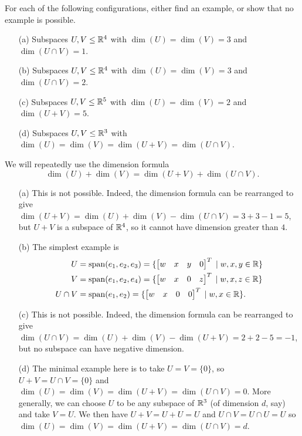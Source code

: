 \documentclass[a4paper]{amsart}
\renewenvironment{solution}{\SolutionInline}{\endSolutionInline}
\begin{document}
\begin{exercise}\label{ex-dim-formula-i}
 For each of the following configurations, either find an example, or
 show that no example is possible.
 \begin{itemize}
  \item[(a)] Subspaces $U,V\leq{\mathbb{R}}^4$ with $\dim(U)=\dim(V)=3$ and
   $\dim(U\cap V)=1$.
  \item[(b)] Subspaces $U,V\leq{\mathbb{R}}^4$ with $\dim(U)=\dim(V)=3$ and
   $\dim(U\cap V)=2$.
  \item[(c)] Subspaces $U,V\leq{\mathbb{R}}^5$ with $\dim(U)=\dim(V)=2$ and
   $\dim(U+V)=5$.
  \item[(d)] Subspaces $U,V\leq{\mathbb{R}}^3$ with
   $\dim(U)=\dim(V)=\dim(U+V)=\dim(U\cap V)$.
 \end{itemize}
\end{exercise}
\begin{solution}
 We will repeatedly use the dimension formula 
 \[ \dim(U)+\dim(V) = \dim(U+V) + \dim(U\cap V). \]
 \begin{itemize}
  \item[(a)] This is not possible.  Indeed, the dimension formula can
   be rearranged to give
   $\dim(U+V)=\dim(U)+\dim(V)-\dim(U\cap V)=3+3-1=5$, but $U+V$ is a
   subspace of ${\mathbb{R}}^4$, so it cannot have dimension greater than $4$.
  \item[(b)] The simplest example is  
    \begin{align*}
     U &= \operatorname{span}(e_1,e_2,e_3)
        = \{\left[\begin{matrix} w & x & y & 0 \end{matrix}\right]^T\;|\; w,x,y\in{\mathbb{R}}\} \\
     V &= \operatorname{span}(e_1,e_2,e_4)
        = \{\left[\begin{matrix} w & x & 0 & z \end{matrix}\right]^T\;|\; w,x,z\in{\mathbb{R}}\} \\
     U\cap V &= \operatorname{span}(e_1,e_2)
        = \{\left[\begin{matrix} w & x & 0 & 0 \end{matrix}\right]^T\;|\; w,x\in{\mathbb{R}}\}.
    \end{align*}
   \item[(c)] This is not possible.  Indeed, the dimension formula can
    be rearranged to give
    $\dim(U\cap V)=\dim(U)+\dim(V)-\dim(U+V)=2+2-5=-1$, but no subspace
    can have negative dimension.
   \item[(d)] The minimal example here is to take $U=V=\{0\}$, so
    $U+V=U\cap V=\{0\}$ and $\dim(U)=\dim(V)=\dim(U+V)=\dim(U\cap V)=0$.
    More generally, we can choose $U$ to be any subspace of ${\mathbb{R}}^3$ (of
    dimension $d$, say) and take $V=U$.  We then have $U+V=U+U=U$ and
    $U\cap V=U\cap U=U$ so $\dim(U)=\dim(V)=\dim(U+V)=\dim(U\cap V)=d$.
 \end{itemize}
\end{solution}
\end{document}
